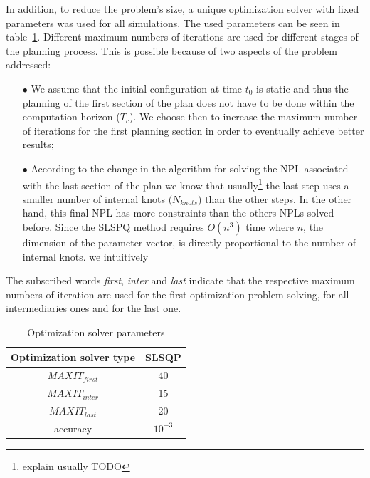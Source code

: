 In addition, to reduce the problem's size, a unique optimization solver with fixed parameters was used for all simulations.
The used parameters can be seen in table~\ref{tab:optparam}. Different maximum numbers of iterations are used for different stages of the planning process. This is possible because of two aspects of the problem addressed:
\begin{itemize}
\item[$\bullet$] We assume that the initial configuration at time $t_0$ is static and thus the planning of the first section of the plan does not have to be done within the computation horizon ($T_c$). We choose then to increase the maximum number of iterations for the first planning section in order to eventually achieve better results;
\item[$\bullet$] According to the change in the algorithm for solving the NPL associated with the last section of the plan we know that usually\footnote{explain usually TODO} the last step uses a smaller number of internal knots ($N_{knots}$) than the other steps. In the other hand, this final NPL has more constraints than the others NPLs solved before. Since the SLSPQ method requires $O(n^3)$ time where $n$, the dimension of the parameter vector, is directly proportional to the number of internal knots.  we intuitively 

\end{itemize}
The subscribed words \textit{first}, \textit{inter} and \textit{last} indicate that the respective maximum numbers of iteration are used for the first
optimization problem solving, for all intermediaries ones and for the last one.


\begin{table}[!h]
\caption {Optimization solver parameters} \label{tab:optparam}
\begin{center}
\begin{tabular}{|c|c|}
\hline
Optimization solver type & SLSQP\\
\hline
$MAXIT_{first}$ & 40\\
\hline
$MAXIT_{inter}$ & 15\\
\hline
$MAXIT_{last}$ & 20\\
\hline
accuracy & $10^{-3}$\\
\hline
\end{tabular}
\end{center}
\end{table}

